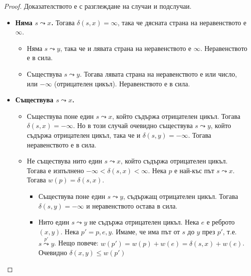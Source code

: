 \documentclass{article}
\renewcommand{\\}{\newline}
\begin{document}
\begin{proof}
    Доказателството е с разглеждане на случаи и подслучаи.
    
    \begin{itemize}
        \item \textbf{Няма \(s \leadsto x\).} Тогава \(\delta(s, x) = \infty\), така че дясната страна на неравенството е \(\infty\).
        \begin{itemize}
            \item Няма \(s \leadsto y\), така че и лявата страна на неравенството е \(\infty\). Неравенството е в сила.
            \item Съществува \(s \leadsto y\). Тогава лявата страна на неравенството е или число, или \(-\infty\) (отрицателен цикъл). Неравенството е в сила.
        \end{itemize}
        
        \item \textbf{Съществува \(s \leadsto x\).}
        \begin{itemize}
            \item Съществува поне един \(s \leadsto x\), който съдържа отрицателен цикъл. Тогава \(\delta(s, x) = -\infty\). Но в този случай очевидно съществува \(s \leadsto y\), който съдържа отрицателен цикъл, така че и \(\delta(s, y) = -\infty\). Тогава неравенството е в сила.
            
            \item Не съществува нито един \(s \leadsto x\), който съдържа отрицателен цикъл. Тогава е изпълнено \(-\infty < \delta(s, x) < \infty\). Нека \(p\) е най-къс път \(s \leadsto x\). Тогава \(w(p) = \delta(s, x)\). \begin{itemize}
                \item Съществува поне един \(s \leadsto y\), съдържащ отрицателен цикъл. Тогава \(\delta(s, y) = -\infty\) и неравенството остава в сила.   
                \item Нито един \(s \leadsto y\) не съдържа отрицателен цикъл. Нека \(e\) е реброто \((x, y)\). Нека \(p' = p, e, y\). Имаме, че има път от \(s\) до \(y\) през \(p'\), т.е. \(s \overset{p'}{\leadsto} y\). Нещо повече: \(w(p') = w(p) + w(e) = \delta(s, x) + w(e)\). Очевидно \(\delta(x, y) \leq w(p')\)  
            \end{itemize}
        \end{itemize}
    \end{itemize}
\end{proof}
\end{document}
